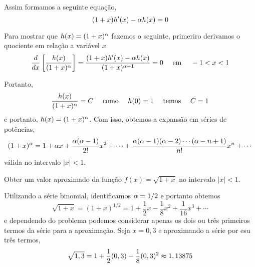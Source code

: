 Assim formamos a seguinte equação,
\begin{equation}\label{quip001}
  (1+x)h'(x)-\alpha h(x)=0
\end{equation}

Para mostrar que $h(x)=(1+x)^{\alpha}$ fazemos o seguinte, primeriro derivamos o quociente em relação a variável $x$
\begin{equation*}
  \frac{d}{dx}\left[ \frac{h(x)}{(1+x)^{\alpha}}\right]=\frac{(1+x)h'(x)-\alpha h(x)}{(1+x)^{\alpha+1}}=0\quad \text{ em } \quad -1<x <1
\end{equation*}

Portanto,
\begin{equation*}
  \frac{h(x)}{(1+x)^{\alpha}}=C\quad \text{ como } \quad h(0)=1\quad \text{ temos } \quad C=1
\end{equation*}
e portanto, $h(x)=(1+x)^{\alpha}$. Com isso, obtemos a expansão em séries de potências,
\begin{equation*}
  (1+x)^{\alpha}=1+\alpha x+\frac{\alpha(\alpha-1)}{2!}x^2+\cdots+\frac{\alpha(\alpha-1)(\alpha-2)\cdots(\alpha-n+1)}{n!}x^n+\cdots
\end{equation*}
válida no intervalo $|x|<1$.

\begin{exer}
Obter um valor aproximado da função $f(x)=\sqrt{1+x}$ no intervalo $|x|<1$.
\end{exer}

\solo Utilizando a série binomial, identificamos $\alpha=1/2$ e portanto obtemos
\begin{equation*}
  \sqrt{1+x}=(1+x)^{1/2}=1+\frac{1}{2}x-\frac{1}{8}x^2+\frac{1}{16}x^3+\cdots
\end{equation*}
e dependendo do problema podemos considerar apenas os dois ou três primeiros termos da série para a aproximação. Seja $x=0,3$ e aproximando a série por esu três termos,
\begin{equation*}
  \sqrt{1,3}=1+\frac{1}{2}(0,3)-\frac{1}{8}(0,3)^2\thickapprox 1,13875
\end{equation*}


